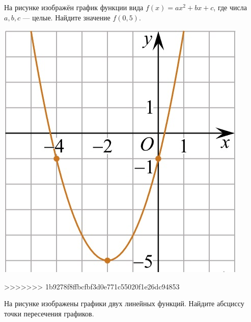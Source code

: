 \begin{homework}[number=2]
\begin{listofex}
\begin{minipage}[c]{0.26\textwidth}
		\end{minipage}
		\item
		\begin{minipage}[t]{0.72\textwidth}
			На рисунке изображён график функции вида \(f(x)=ax^2+bx+c\), где числа \(a, b, c\) --- целые. Найдите значение \(f(0,5)\).
		\end{minipage}
		\begin{minipage}[c]{0.24\textwidth}
			\includegraphics[align=t, width=\textwidth]{pics/G101M4H2-4.jpg}
		\end{minipage}
		\item
>>>>>>> 1b9278f8ffbcfbf3d0e771c55020f1e26dc94853
		\begin{minipage}[t]{0.67\textwidth}
			На рисунке изображены графики двух линейных функций. Найдите абсциссу точки пересечения графиков.
		\end{minipage}
		\begin{minipage}[c]{0.25\textwidth}

\end{minipage}
\end{listofex}
\end{homework}
